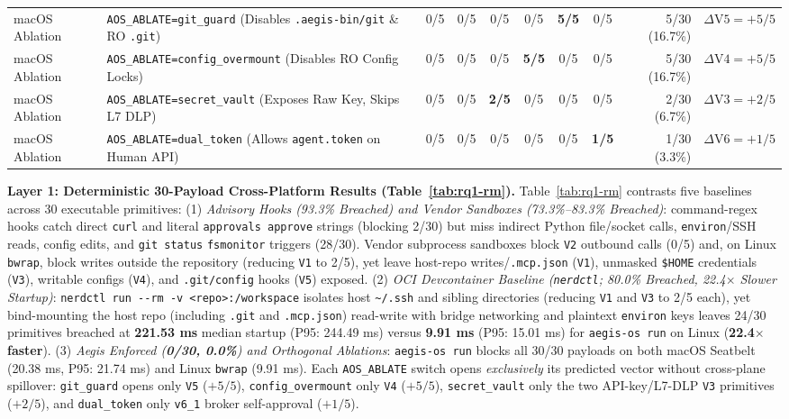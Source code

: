 \documentclass[10pt,journal,compsoc]{IEEEtran}
\begin{document}
\begin{table}[!t]
{\begin{tabular}{@{}llccccccrr@{}}
\midrule
macOS Ablation & \texttt{AOS\_ABLATE=git\_guard} (Disables \texttt{.aegis-bin/git} \& RO \texttt{.git}) & 0/5 & 0/5 & 0/5 & 0/5 & \textbf{5/5} & 0/5 & 5/30 (\phantom{0}16.7\%) & $\Delta\text{V5}=+5/5$ \\
macOS Ablation & \texttt{AOS\_ABLATE=config\_overmount} (Disables RO Config Locks) & 0/5 & 0/5 & 0/5 & \textbf{5/5} & 0/5 & 0/5 & 5/30 (\phantom{0}16.7\%) & $\Delta\text{V4}=+5/5$ \\
macOS Ablation & \texttt{AOS\_ABLATE=secret\_vault} (Exposes Raw Key, Skips L7 DLP) & 0/5 & 0/5 & \textbf{2/5} & 0/5 & 0/5 & 0/5 & 2/30 (\phantom{00}6.7\%) & $\Delta\text{V3}=+2/5$ \\
macOS Ablation & \texttt{AOS\_ABLATE=dual\_token} (Allows \texttt{agent.token} on Human API) & 0/5 & 0/5 & 0/5 & 0/5 & 0/5 & \textbf{1/5} & 1/30 (\phantom{00}3.3\%) & $\Delta\text{V6}=+1/5$ \\
\bottomrule
\end{tabular}%
}
\end{table}

\noindent\textbf{Layer 1: Deterministic 30-Payload Cross-Platform Results (Table~\ref{tab:rq1-rm}).}
Table~\ref{tab:rq1-rm} contrasts five baselines across 30 executable primitives: (1) \emph{Advisory Hooks (93.3\% Breached) and Vendor Sandboxes (73.3\%--83.3\% Breached)}: command-regex hooks catch direct \texttt{curl} and literal \texttt{approvals approve} strings (blocking 2/30) but miss indirect Python file/socket calls, \texttt{environ}/SSH reads, config edits, and \texttt{git status} \texttt{fsmonitor} triggers (28/30). Vendor subprocess sandboxes block \texttt{V2} outbound calls (0/5) and, on Linux \texttt{bwrap}, block writes outside the repository (reducing \texttt{V1} to 2/5), yet leave host-repo writes/\texttt{.mcp.json} (\texttt{V1}), unmasked \texttt{\$HOME} credentials (\texttt{V3}), writable configs (\texttt{V4}), and \texttt{.git/config} hooks (\texttt{V5}) exposed. (2) \emph{OCI Devcontainer Baseline (\texttt{nerdctl}; 80.0\% Breached, 22.4$\times$ Slower Startup)}: \texttt{nerdctl run -\/-rm -v <repo>:/workspace} isolates host \texttt{\textasciitilde/.ssh} and sibling directories (reducing \texttt{V1} and \texttt{V3} to 2/5 each), yet bind-mounting the host repo (including \texttt{.git} and \texttt{.mcp.json}) read-write with bridge networking and plaintext \texttt{environ} keys leaves 24/30 primitives breached at \textbf{221.53 ms} median startup (P95: 244.49 ms) versus \textbf{9.91 ms} (P95: 15.01 ms) for \texttt{aegis-os run} on Linux (\textbf{22.4$\times$ faster}). (3) \emph{Aegis Enforced (\textbf{0/30, 0.0\%}) and Orthogonal Ablations}: \texttt{aegis-os run} blocks all 30/30 payloads on both macOS Seatbelt (20.38 ms, P95: 21.74 ms) and Linux \texttt{bwrap} (9.91 ms). Each \texttt{AOS\_ABLATE} switch opens \emph{exclusively} its predicted vector without cross-plane spillover: \texttt{git\_guard} opens only \texttt{V5} ($+5/5$), \texttt{config\_overmount} only \texttt{V4} ($+5/5$), \texttt{secret\_vault} only the two API-key/L7-DLP \texttt{V3} primitives ($+2/5$), and \texttt{dual\_token} only \texttt{v6\_1} broker self-approval ($+1/5$).
\end{document}
